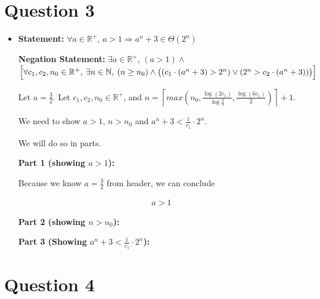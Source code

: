 \documentclass[12pt]{article}
\begin{document}
\section*{Question 3}
\begin{itemize}
    \item

    \textbf{Statement:} $\forall a \in \mathbb{R}^{+}$, $a > 1 \Rightarrow a^n + 3 \in \Theta(2^n)$

    \bigskip

    \textbf{Negation Statement:} $\exists a \in \mathbb{R}^{+}$, $(a > 1) \land $
    $\Bigl[ \forall c_1,c_2,n_0 \in \mathbb{R}^{+},\:\exists n \in \mathbb{N},\:
    (n \geq n_0) \land \bigl( (c_1 \cdot (a^n+3) > 2^n) \lor (2^n > c_2 \cdot (a^n+3)) \bigr) \Bigr]$

    \bigskip

    Let $a = \frac{3}{2}$. Let $c_1,c_2,n_0 \in \mathbb{R}^{+}$, and $n = \left\lceil max(n_0, \frac{\log(2c_1)}{\log \frac{4}{3}}, \frac{\log(6c_1)}{2}) \right\rceil + 1$.

    \bigskip

    We need to show $a > 1$, $n > n_0$ and $a^n + 3 < \frac{1}{c_1} \cdot 2^n$.

    \bigskip

    We will do so in parts.

    \bigskip

    \textbf{Part 1 (showing $a > 1$):}

    \bigskip

    Because we know $a = \frac{3}{2}$ from header, we can conclude

    \setcounter{equation}{0}
    \begin{align}
        a > 1
    \end{align}

    \bigskip

    \textbf{Part 2 (showing $n > n_0$):}

    \bigskip

    \textbf{Part 3 (Showing $a^n + 3 < \frac{1}{c_1} \cdot 2^n$):}


 \end{itemize}

\section*{Question 4}
\end{document}
